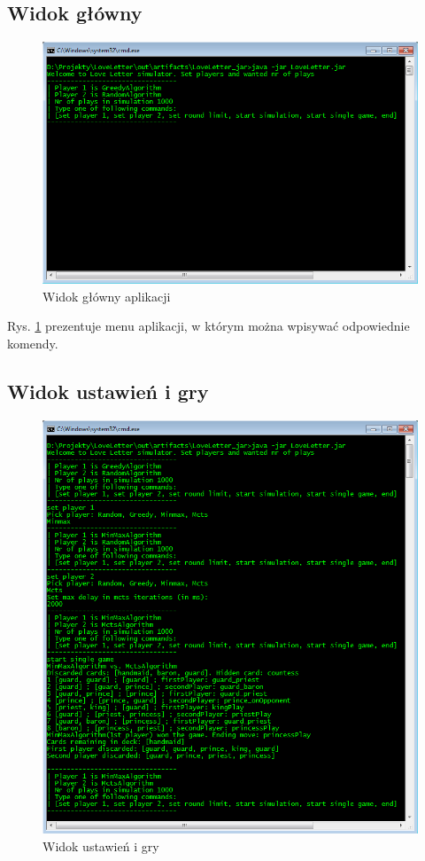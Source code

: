 \subsection*{Widok główny}
\begin{figure}[H]
	\centering
	\includegraphics[width=\textwidth]{Resources/cli.PNG}
	\caption{Widok główny aplikacji} 
	\label{fig:cli}
\end{figure}
Rys. \ref{fig:cli} prezentuje menu aplikacji, w którym można wpisywać odpowiednie komendy.

\subsection*{Widok ustawień i gry}
\begin{figure}[H]
	\centering
	\includegraphics[width=\textwidth]{Resources/cli2.PNG}
	\caption{Widok ustawień i gry} 
	\label{fig:cli2}
\end{figure}

